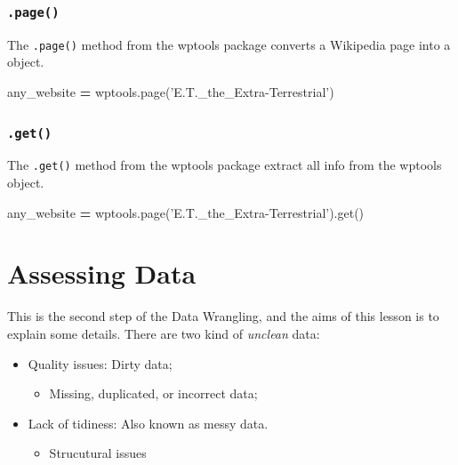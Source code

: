 \documentclass[]{book}
\newenvironment{Shaded}{\begin{snugshade}}{\end{snugshade}}
\newcommand{\StringTok}[1]{\textcolor[rgb]{0.31,0.60,0.02}{#1}}
\newcommand{\OperatorTok}[1]{\textcolor[rgb]{0.81,0.36,0.00}{\textbf{#1}}}
\newcommand{\NormalTok}[1]{#1}
\providecommand{\tightlist}{%
  \setlength{\itemsep}{0pt}\setlength{\parskip}{0pt}}
\begin{document}
\subsubsection{\texorpdfstring{\texttt{.page()}}{.page()}}\label{page}

The \texttt{.page()} method from the wptools package converts a
Wikipedia page into a object.

\begin{Shaded}
\begin{Highlighting}[]
\NormalTok{any_website }\OperatorTok{=}\NormalTok{ wptools.page(}\StringTok{'E.T._the_Extra-Terrestrial'}\NormalTok{)}
\end{Highlighting}
\end{Shaded}

\subsubsection{\texorpdfstring{\texttt{.get()}}{.get()}}\label{get}

The \texttt{.get()} method from the wptools package extract all info
from the wptools object.

\begin{Shaded}
\begin{Highlighting}[]
\NormalTok{any_website }\OperatorTok{=}\NormalTok{ wptools.page(}\StringTok{'E.T._the_Extra-Terrestrial'}\NormalTok{).get()}
\end{Highlighting}
\end{Shaded}

\section{Assessing Data}\label{assessing-data}

This is the second step of the Data Wrangling, and the aims of this
lesson is to explain some details. There are two kind of \emph{unclean}
data:

\begin{itemize}
\tightlist
\item
  Quality issues: Dirty data;

  \begin{itemize}
  \tightlist
  \item
    Missing, duplicated, or incorrect data;
  \end{itemize}
\item
  Lack of tidiness: Also known as messy data.

  \begin{itemize}
  \tightlist
  \item
    Strucutural issues
  \end{itemize}
\end{itemize}
\end{document}
